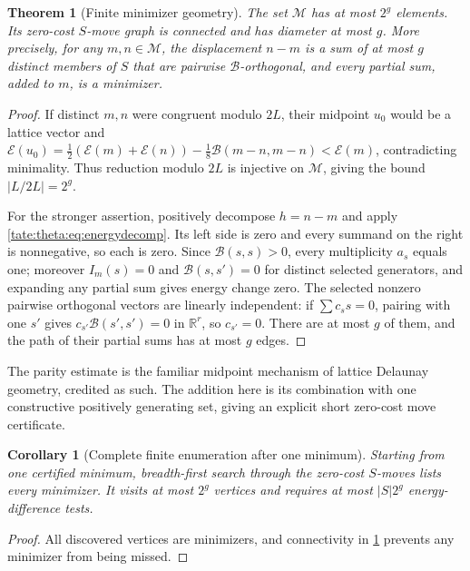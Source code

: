 \documentclass[11pt,letterpaper]{article}
\newtheorem{theorem}{Theorem}[section]
\newtheorem{corollary}[corollary]{Corollary}
\theoremstyle{definition}
\newcommand{\R}{\mathbb R}
\newcommand{\cB}{\mathcal B}
\newcommand{\cE}{\mathcal E}
\newcommand{\cM}{\mathcal M}
\begin{document}
\begin{theorem}[Finite minimizer geometry]\label{tate:theta:thm:minimizers}
The set $\cM$ has at most $2^g$ elements. Its zero-cost $S$-move graph is
connected and has diameter at most $g$. More precisely, for any
$m,n\in\cM$, the displacement $n-m$ is a sum of at most $g$ distinct members
of $S$ that are pairwise $\cB$-orthogonal, and every partial sum, added to
$m$, is a minimizer.
\end{theorem}

\begin{proof}
If distinct $m,n$ were congruent modulo $2L$, their midpoint $u_0$ would be
a lattice vector and
$\cE(u_0)=\tfrac12(\cE(m)+\cE(n))-\tfrac18\cB(m-n,m-n)<\cE(m)$,
contradicting minimality. Thus reduction modulo $2L$ is injective on $\cM$,
giving the bound $|L/2L|=2^g$.

For the stronger assertion, positively decompose $h=n-m$ and apply
\eqref{tate:theta:eq:energydecomp}. Its left side is zero and every summand
on the right is nonnegative, so each is zero. Since $\cB(s,s)>0$, every
multiplicity $a_s$ equals one; moreover $I_m(s)=0$ and $\cB(s,s')=0$ for
distinct selected generators, and expanding any partial sum gives energy
change zero. The selected nonzero pairwise orthogonal vectors are linearly
independent: if $\sum c_ss=0$, pairing with one $s'$ gives
$c_{s'}\cB(s',s')=0$ in $\R^r$, so $c_{s'}=0$. There are at most $g$ of
them, and the path of their partial sums has at most $g$ edges.
\end{proof}

The parity estimate is the familiar midpoint mechanism of lattice Delaunay
geometry, credited as such. The addition here is its combination with one
constructive positively generating set, giving an explicit short zero-cost
move certificate.

\begin{corollary}[Complete finite enumeration after one minimum]\label{tate:theta:cor:BFS}
Starting from one certified minimum, breadth-first search through the
zero-cost $S$-moves lists every minimizer. It visits at most $2^g$ vertices
and requires at most $|S|2^g$ energy-difference tests.
\end{corollary}

\begin{proof}
All discovered vertices are minimizers, and connectivity in
\cref{tate:theta:thm:minimizers} prevents any minimizer from being missed.
\end{proof}
\end{document}
